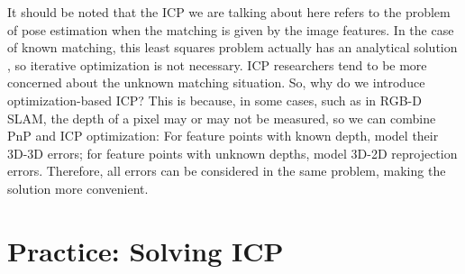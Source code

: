 It should be noted that the ICP we are talking about here refers to the problem of pose estimation when the matching is given by the image features. In the case of known matching, this least squares problem actually has an analytical solution \textsuperscript{\cite{Faugeras1986, Horn1987, Sharp2002}}, so iterative optimization is not necessary. ICP researchers tend to be more concerned about the unknown matching situation. So, why do we introduce optimization-based ICP? This is because, in some cases, such as in RGB-D SLAM, the depth of a pixel may or may not be measured, so we can combine PnP and ICP optimization: For feature points with known depth, model their 3D-3D errors; for feature points with unknown depths, model 3D-2D reprojection errors. Therefore, all errors can be considered in the same problem, making the solution more convenient.

\section{Practice: Solving ICP}
